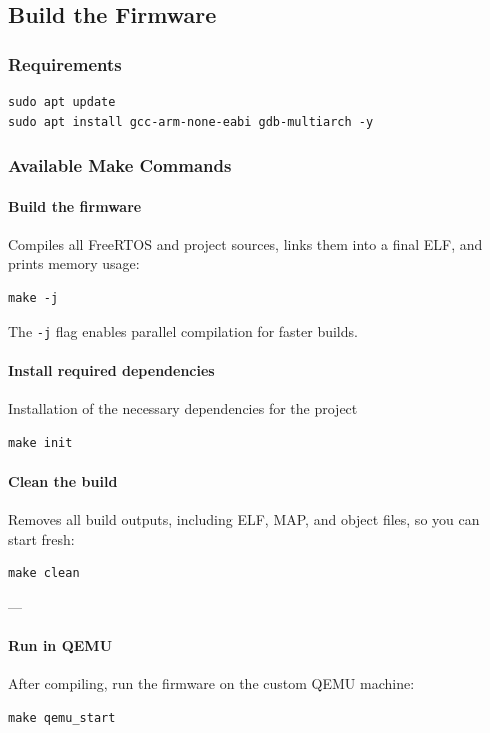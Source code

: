 \documentclass{article}
\begin{document}
\subsection{Build the Firmware}
\subsubsection*{Requirements}
\begin{verbatim}
sudo apt update
sudo apt install gcc-arm-none-eabi gdb-multiarch -y
\end{verbatim}


\subsubsection*{Available Make Commands}

\paragraph{Build the firmware}
Compiles all FreeRTOS and project sources, links them into a final ELF, and prints memory usage:
\begin{verbatim}
make -j
\end{verbatim}

The \texttt{-j} flag enables parallel compilation for faster builds.

\paragraph{Install required dependencies}
Installation of the necessary dependencies for the project
\begin{verbatim}
make init
\end{verbatim}

\paragraph{Clean the build}
Removes all build outputs, including ELF, MAP, and object files, so you can start fresh:
\begin{verbatim}
make clean
\end{verbatim}

---

\paragraph{Run in QEMU}
After compiling, run the firmware on the custom QEMU machine:
\begin{verbatim}
make qemu_start
\end{verbatim}
\end{document}
